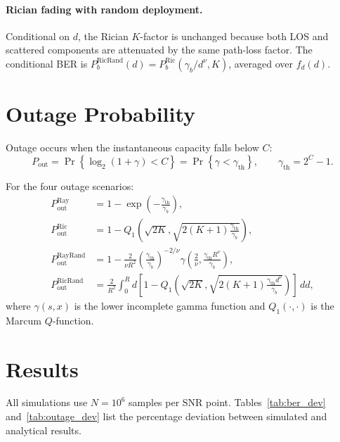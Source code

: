 \documentclass[12pt,a4paper]{article}
\begin{document}
\paragraph{Rician fading with random deployment.} Conditional on $d$, the Rician $K$-factor is unchanged because both LOS and scattered components are attenuated by the same path-loss factor. The conditional BER is $P_b^{\text{RicRand}}(d)=P_b^{\text{Ric}}(\gamma_b/d^\nu,K)$, averaged over $f_d(d)$.

\section{Outage Probability}\label{sec:outage}
Outage occurs when the instantaneous capacity falls below $C$:
\begin{equation}
    P_{\text{out}} = \Pr\left\{\log_2(1+\gamma) < C\right\}
    = \Pr\left\{\gamma < \gamma_{\text{th}}\right\},
    \qquad \gamma_{\text{th}} = 2^C - 1.
\end{equation}

For the four outage scenarios:
\begin{align}
    P_{\text{out}}^{\text{Ray}} &= 1 - \exp\!\left(-\frac{\gamma_{\text{th}}}{\gamma_b}\right), \\
    P_{\text{out}}^{\text{Ric}} &= 1 - Q_1\!\left(\sqrt{2K},\sqrt{2(K+1)\frac{\gamma_{\text{th}}}{\gamma_b}}\right), \\
    P_{\text{out}}^{\text{RayRand}} &=
    1 - \frac{2}{\nu R^2}
    \left(\frac{\gamma_{\text{th}}}{\gamma_b}\right)^{-2/\nu}
    \gamma\!\left(\frac{2}{\nu}, \frac{\gamma_{\text{th}}R^\nu}{\gamma_b}\right), \\
    P_{\text{out}}^{\text{RicRand}} &=
    \frac{2}{R^2}\int_{0}^{R}
    d\left[1 - Q_1\!\left(\sqrt{2K},\sqrt{2(K+1)\frac{\gamma_{\text{th}}d^\nu}{\gamma_b}}\right)\right]
    \,dd,
\end{align}
where $\gamma(s,x)$ is the lower incomplete gamma function and $Q_1(\cdot,\cdot)$ is the Marcum $Q$-function.

\section{Results}\label{sec:results}
All simulations use $N=10^6$ samples per SNR point. Tables~\ref{tab:ber_dev} and~\ref{tab:outage_dev} list the percentage deviation between simulated and analytical results.
\end{document}
